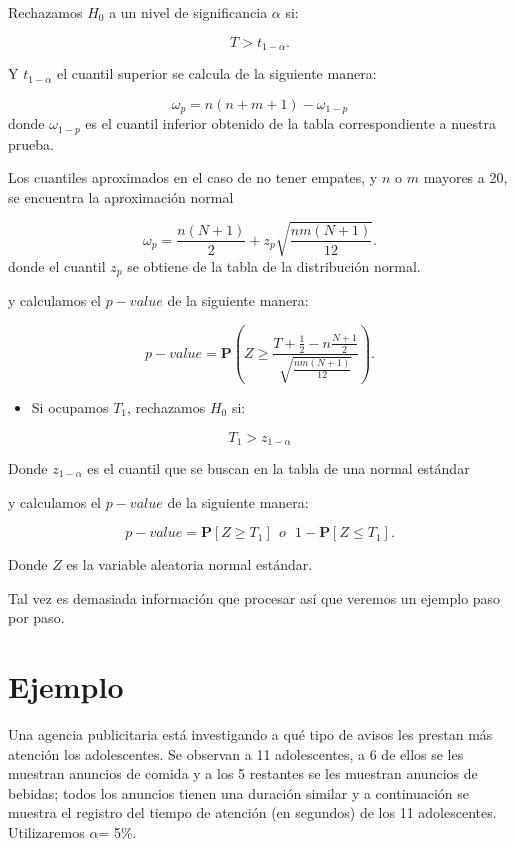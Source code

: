 \documentclass[
  a4paper,
  oneside,
  openany]{book}
\providecommand{\tightlist}{%
  \setlength{\itemsep}{0pt}\setlength{\parskip}{0pt}}
\begin{document}
Rechazamos \(H_0\) a un nivel de significancia \(\alpha\) si:

\[T > t_{1-{\alpha}}.\]

Y \(t_{1-\alpha}\) el cuantil superior se calcula de la siguiente manera:

\[\omega_p= n(n+m+1)-\omega_{1-p}\]
donde \(\omega_{1-p}\) es el cuantil inferior obtenido de la tabla correspondiente a nuestra prueba.

Los cuantiles aproximados en el caso de no tener empates, y \(n\) o \(m\) mayores a 20, se encuentra la aproximación normal

\[ \omega_p= \frac{n(N+1)}{2} + z_p\sqrt{\frac{n m(N+1)}{12}}.\]
donde el cuantil \(z_p\) se obtiene de la tabla de la distribución normal.

y calculamos el \(p-value\) de la siguiente manera:

\[p-value = \mathbf{P}\left(Z\geq\frac{T+\frac{1}{2}-n\frac{N+1}{2}}{\sqrt{\frac{nm(N+1)}{12}}}\right).\]

\begin{itemize}
\tightlist
\item
  Si ocupamos \(T_{1}\), rechazamos \(H_0\) si:
\end{itemize}

\[T_{1} > z_{1-\alpha}\]

Donde \(z_{1-\alpha}\) es el cuantil que se buscan en la tabla de una normal estándar

y calculamos el \(p-value\) de la siguiente manera:

\[p-value=\mathbf{P}[Z\geq T_{1}] \ \ o \ \  \ 1-\mathbf{P}[Z\leq T_{1}].\]

Donde \(Z\) es la variable aleatoria normal estándar.

Tal vez es demasiada información que procesar así que veremos un ejemplo paso por paso.

\hypertarget{ejemplo-5}{%
\section{Ejemplo}\label{ejemplo-5}}

Una agencia publicitaria está investigando a qué tipo de avisos les prestan más atención los adolescentes. Se observan a 11 adolescentes, a 6 de ellos se les muestran anuncios de comida y a los 5 restantes se les muestran anuncios de bebidas; todos los anuncios tienen una duración similar y a continuación se muestra el registro del tiempo de atención (en segundos) de los 11 adolescentes.
Utilizaremos \(\alpha\)= 5\%.
\end{document}
